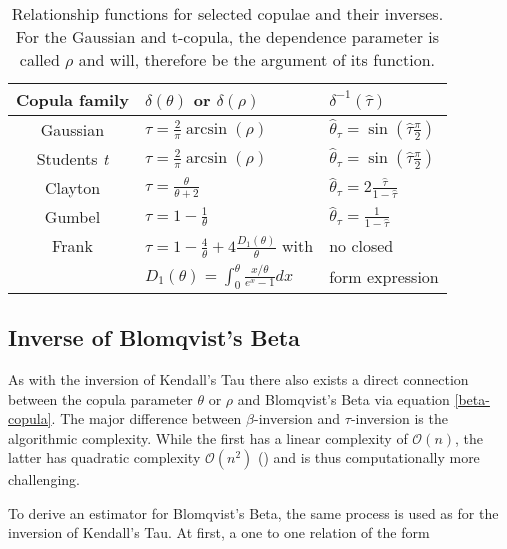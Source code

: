 \begin{table}
	
	\centering
{\renewcommand{\arraystretch}{1.4}
\begin{tabular}{c|l|l}
	\hline
	Copula family & $\delta(\theta)$ or $\delta(\rho)$ & $\delta^{-1}(\hat{\tau})$ \\
	\hline
	\hline
	Gaussian & $\tau=\frac{2}{\pi} \arcsin (\rho)$ & $\hat{\theta}_\tau =\sin(\hat{\tau}\frac{\pi}{2})$ \\
	\hline
	Students \textit{t}& $\tau=\frac{2}{\pi} \arcsin (\rho)$ & $\hat{\theta}_\tau =\sin(\hat{\tau}\frac{\pi}{2})$ \\
	\hline
	Clayton & $\tau = \frac{\theta}{\theta + 2}$ & $\hat{\theta}_\tau =2\frac{\hat{\tau}}{1-\hat{\tau}}$ \\
	\hline
	Gumbel & $\tau = 1-\frac{1}{\theta}$ & $\hat{\theta}_\tau =\frac{1}{1-\hat{\tau}}$ \\
	\hline
	Frank & $\tau = 1- \frac{4}{\theta}+4\frac{D_1(\theta)}{\theta}$ with & no closed  \\
	& $D_{1}(\theta)=\int_{0}^{\theta} \frac{x / \theta}{e^{x}-1} d x$ & form expression \\
\end{tabular}
}
	\caption[Relationship functions and inverses for the inversion of Kendall's Tau]{Relationship functions for selected copulae and their inverses. For the Gaussian and t-copula, the dependence parameter is called $\rho$ and will, therefore be the argument of its function.}
	\label{iTau-rel-funcs}
\end{table}

\subsection{Inverse of Blomqvist's Beta}

As with the inversion of Kendall's Tau there also exists a direct connection between the copula parameter $\theta$ or $\rho$ and Blomqvist's Beta via equation \ref{beta-copula}. The major difference between $\beta$-inversion and $\tau$-inversion is the algorithmic complexity. While the first has a linear complexity of $\mathcal{O}(n)$, the latter has quadratic complexity $\mathcal{O}(n^2)$ (\cite[see][]{genest2013copula}) and is thus computationally more challenging.

To derive an estimator for Blomqvist's Beta, the same process is used as for the inversion of Kendall's Tau. At first, a one to one relation of the form 

